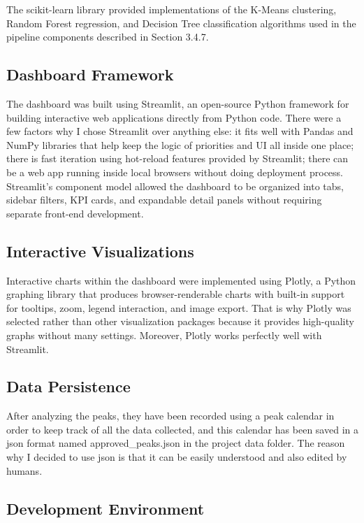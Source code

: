 The scikit-learn library \citep{Pedregosa2011} provided implementations of the K-Means clustering, Random Forest regression, and Decision Tree classification algorithms used in the pipeline components described in Section 3.4.7.

\subsection{Dashboard Framework}

The dashboard was built using Streamlit, an open-source Python framework for building interactive web applications directly from Python code. There were a few factors why I chose Streamlit over anything else: it fits well with Pandas and NumPy libraries that help keep the logic of priorities and UI all inside one place; there is fast iteration using hot-reload features provided by Streamlit; there can be a web app running inside local browsers without doing deployment process. Streamlit's component model allowed the dashboard to be organized into tabs, sidebar filters, KPI cards, and expandable detail panels without requiring separate front-end development.

\subsection{Interactive Visualizations}

Interactive charts within the dashboard were implemented using Plotly, a Python graphing library that produces browser-renderable charts with built-in support for tooltips, zoom, legend interaction, and image export. That is why Plotly was selected rather than other visualization packages because it provides high-quality graphs without many settings. Moreover, Plotly works perfectly well with Streamlit.

\subsection{Data Persistence}

After analyzing the peaks, they have been recorded using a peak calendar in order to keep track of all the data collected, and this calendar has been saved in a json format named approved\_peaks.json in the project data folder. The reason why I decided to use json is that it can be easily understood and also edited by humans.

\subsection{Development Environment}

